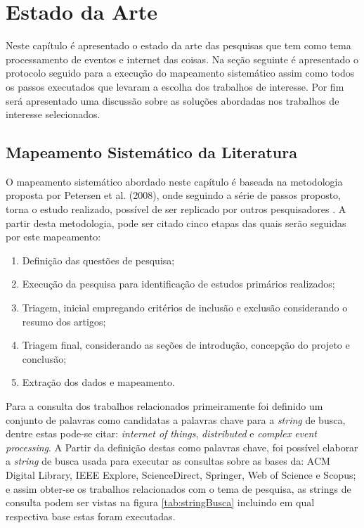 \documentclass[ti,table]{texufpel} %
\begin{document}

\chapter{Estado da Arte} 
\label{cap:Estado_da_Arte}

Neste capítulo é apresentado o estado da arte das pesquisas que tem como tema processamento de eventos e internet das coisas. Na seção seguinte é apresentado o protocolo seguido para a execução do mapeamento sistemático assim como todos os passos executados que levaram a escolha dos trabalhos de interesse. Por fim será apresentado uma discussão sobre as soluções abordadas nos trabalhos de interesse selecionados.    

\section{Mapeamento Sistemático da Literatura}

O mapeamento sistemático abordado neste capítulo é baseada na metodologia proposta por Petersen et al. (2008), onde seguindo a série de passos proposto, torna o estudo realizado, possível de ser replicado por outros pesquisadores \cite{petersen08}. A partir desta metodologia, pode ser citado cinco etapas das quais serão seguidas por este mapeamento:

\begin{enumerate}
	\item Definição das questões de pesquisa;
	\item Execução da pesquisa para identificação de estudos primários realizados;
	\item Triagem, inicial empregando critérios de inclusão e exclusão considerando o resumo dos artigos;
	\item Triagem final, considerando as seções de introdução, concepção do projeto e conclusão;
	\item Extração dos dados e mapeamento.
	

\end{enumerate}  

Para a consulta dos trabalhos relacionados primeiramente foi definido um conjunto de palavras como candidatas a palavras chave para a \textit{string} de busca, dentre estas pode-se citar: \textit{internet of things}, \textit{distributed} e \textit{complex event processing}. A Partir da definição destas como palavras chave, foi possível elaborar a \textit{string} de busca usada para executar as consultas sobre as bases da: ACM Digital Library, IEEE Explore, ScienceDirect, Springer, Web of Science e Scopus; e assim obter-se os trabalhos relacionados com o tema de pesquisa, as strings de consulta podem ser vistas na figura \ref{tab:stringBusca} incluindo em qual respectiva base estas foram executadas.
\end{document}
